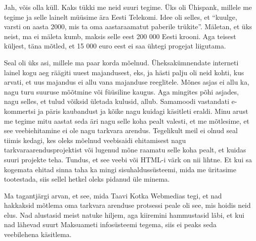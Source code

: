 
Jah, võis olla küll. Kaks tükki me neid suuri tegime. Üks oli Ühispank, millele 
me tegime ja selle lainelt müüsime ära Eesti Telekomi. 
Idee oli selles, et \enquote{kuulge, varsti on aasta 2000, mis ta oma 
aastaraamatut paberile trükite}. Mäletan, et üks neist, ma ei mäleta kumb, 
maksis selle eest 200 000 Eesti krooni. Aga teisest küljest, täna mõtled, et 15 
000 euro eest ei saa ühtegi progejat liigutama.


Seal oli üks asi, millele ma paar korda mõelnud. Üheksakümnendate interneti 
lainel kogu aeg räägiti uuest majandusest, eks, ja hästi palju oli neid kohti, 
kus arvati, et uus majandus ei allu vana majanduse reeglitele. Mõnes asjas ei 
allu ka, nagu turu suuruse mõõtmine või füüsiline kaugus. Aga mingites põhi 
asjades, nagu selles, et tulud võiksid ületada kulusid, allub. Samamoodi 
vastandati e-kommertsi ja päris kaubandust ja kõike nagu kuidagi käsitleti 
eraldi. Minu arust me tegime mitu aastat seda äri nagu selle koha pealt 
valesti, et me mõtlesime, et see veebiehitamine ei ole nagu tarkvara arendus. 
Tegelikult meil ei olnud seal tiimis kedagi, kes oleks mõelnud veebisaidi 
ehitamisest nagu tarkvaraarendusprojektist või lugenud mõne raamatu selle koha 
pealt, et kuidas suuri projekte teha. Tundus, et see veebi või HTML-i värk on 
nii lihtne. Et kui sa kogemata ehitad sinna taha ka mingi sisuhaldussüsteemi, 
mida me üritasime tootestada, siis sellel hetkel oleks pidanud  üle minema. 

Ma tagantjärgi arvan, et see, mida Taavi Kotka  
Webmedias   tegi, et nad hakkaksid 
mõtlema oma tarkvara arenduse protsessi peale oli see, mis hoidis neid  elus. 
Nad alustasid meist  natuke hiljem, aga kiiremini hammustasid läbi, et kui nad 
lähevad suurt Maksuameti infosüsteemi tegema, siis ei peaks seda veebilehena 
käsitlema. 

